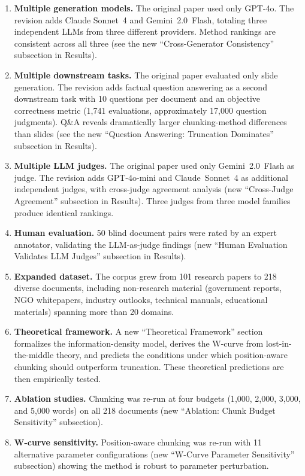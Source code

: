 \documentclass[11pt]{article}
\begin{document}
\begin{enumerate}
    \item \textbf{Multiple generation models.} The original paper used only GPT-4o. The revision adds Claude Sonnet~4 and Gemini~2.0~Flash, totaling three independent LLMs from three different providers. Method rankings are consistent across all three (see the new ``Cross-Generator Consistency'' subsection in Results).
    \item \textbf{Multiple downstream tasks.} The original paper evaluated only slide generation. The revision adds factual question answering as a second downstream task with 10 questions per document and an objective correctness metric (1{,}741 evaluations, approximately 17{,}000 question judgments). Q\&A reveals dramatically larger chunking-method differences than slides (see the new ``Question Answering: Truncation Dominates'' subsection in Results).
    \item \textbf{Multiple LLM judges.} The original paper used only Gemini~2.0~Flash as judge. The revision adds GPT-4o-mini and Claude~Sonnet~4 as additional independent judges, with cross-judge agreement analysis (new ``Cross-Judge Agreement'' subsection in Results). Three judges from three model families produce identical rankings.
    \item \textbf{Human evaluation.} 50 blind document pairs were rated by an expert annotator, validating the LLM-as-judge findings (new ``Human Evaluation Validates LLM Judges'' subsection in Results).
    \item \textbf{Expanded dataset.} The corpus grew from 101 research papers to 218 diverse documents, including non-research material (government reports, NGO whitepapers, industry outlooks, technical manuals, educational materials) spanning more than 20 domains.
    \item \textbf{Theoretical framework.} A new ``Theoretical Framework'' section formalizes the information-density model, derives the W-curve from lost-in-the-middle theory, and predicts the conditions under which position-aware chunking should outperform truncation. These theoretical predictions are then empirically tested.
    \item \textbf{Ablation studies.} Chunking was re-run at four budgets (1{,}000, 2{,}000, 3{,}000, and 5{,}000 words) on all 218 documents (new ``Ablation: Chunk Budget Sensitivity'' subsection).
    \item \textbf{W-curve sensitivity.} Position-aware chunking was re-run with 11 alternative parameter configurations (new ``W-Curve Parameter Sensitivity'' subsection) showing the method is robust to parameter perturbation.

\end{enumerate}
\end{document}
